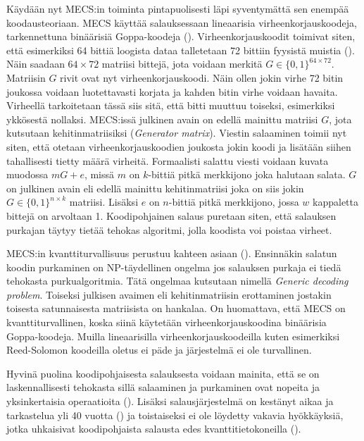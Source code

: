 Käydään nyt MECS:in toiminta pintapuolisesti läpi syventymättä sen enempää koodausteoriaan. MECS käyttää salauksessaan lineaarisia virheenkorjauskoodeja, tarkennettuna binäärisiä Goppa-koodeja (\cite{8012331}). Virheenkorjauskoodit toimivat siten, että esimerkiksi 64 bittiä loogista dataa talletetaan 72 bittiin fyysistä muistia (\cite{overbeck2009code}). Näin saadaan $64 \times 72$ matriisi bittejä, jota voidaan merkitä $G \in \{0, 1\}^{64 \times 72}$. Matriisin $G$ rivit ovat nyt virheenkorjauskoodi. Näin ollen jokin virhe 72 bitin joukossa voidaan luotettavasti korjata ja kahden bitin virhe voidaan havaita. Virheellä tarkoitetaan tässä siis sitä, että bitti muuttuu toiseksi, esimerkiksi ykkösestä nollaksi. MECS:issä julkinen avain on edellä mainittu matriisi $G$, jota kutsutaan kehitinmatriisiksi (\emph{Generator matrix}). Viestin salaaminen toimii nyt siten, että otetaan virheenkorjauskoodien joukosta jokin koodi ja lisätään siihen tahallisesti tietty määrä virheitä. Formaalisti salattu viesti voidaan kuvata muodossa $mG+e$, missä $m$ on $k$-bittiä pitkä merkkijono joka halutaan salata. $G$ on julkinen avain eli edellä mainittu kehitinmatriisi joka on siis jokin $G \in \{0, 1\}^{n \times k}$ matriisi. Lisäksi $e$ on $n$-bittiä pitkä merkkijono, jossa $w$ kappaletta bittejä on arvoltaan 1. Koodipohjainen salaus puretaan siten, että salauksen purkajan täytyy tietää tehokas algoritmi, jolla koodista voi poistaa virheet.

MECS:in kvanttiturvallisuus perustuu kahteen asiaan (\cite{8012331}). Ensinnäkin salatun koodin purkaminen on NP-täydellinen ongelma jos salauksen purkaja ei tiedä tehokasta purkualgoritmia. Tätä ongelmaa kutsutaan nimellä \emph{Generic decoding problem}. Toiseksi julkisen avaimen eli kehitinmatriisin erottaminen jostakin toisesta satunnaisesta matriisista on hankalaa. On huomattava, että MECS on kvanttiturvallinen, koska siinä käytetään virheenkorjauskoodina binäärisia Goppa-koodeja. Muilla lineaarisilla virheenkorjauskoodeilla kuten esimerkiksi Reed-Solomon koodeilla oletus ei päde ja järjestelmä ei ole turvallinen.

Hyvinä puolina koodipohjaisesta salauksesta voidaan mainita, että se on laskennallisesti tehokasta sillä salaaminen ja purkaminen ovat nopeita ja yksinkertaisia operaatioita (\cite{overbeck2009code}). Lisäksi salausjärjestelmä on kestänyt aikaa ja tarkastelua yli 40 vuotta (\cite{8012331}) ja toistaiseksi ei ole löydetty vakavia hyökkäyksiä, jotka uhkaisivat koodipohjaista salausta edes kvanttitietokoneilla (\cite{overbeck2009code}).

